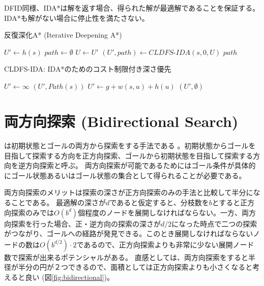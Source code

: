 DFID同様、IDA*は解を返す場合、得られた解が最適解であることを保証する。
IDA*も解がない場合に停止性を満たさない。

\begin{algorithm}
\caption{反復深化A* (Iterative Deepening A*)}
\label{alg:ida}
        $U' \leftarrow h(s)$\;
        $path \leftarrow \emptyset$\;
         {
          $U \leftarrow U'$\;
          $(U', path) \leftarrow CLDFS\text{-}IDA(s, 0, U)$\;
        }
        \Return $path$\;
\end{algorithm}

\begin{algorithm}
\caption{CLDFS-IDA: IDA*のためのコスト制限付き深さ優先}
\label{alg:cldfs-ida}
        $U' \leftarrow \infty$\;
	 {
		\Return $(U', Path(s))$\;
	}
	 {
	   {
             {
              $U' \leftarrow g + w(s, u) + h(u)$\;
              }
            }
	}
	\Return $(U', \emptyset)$\;
\end{algorithm}



\section{両方向探索 (Bidirectional Search)}
\label{sec:bidirectional-search}

は初期状態とゴールの両方から探索をする手法である \cite{pohl1971bi}。初期状態からゴールを目指して探索する方向を正方向探索、ゴールから初期状態を目指して探索する方向を逆方向探索と呼ぶ。
両方向探索が可能であるためにはゴール条件が具体的にゴール状態あるいはゴール状態の集合として得られることが必要である。

両方向探索のメリットは探索の深さが正方向探索のみの手法と比較して半分になることである。
最適解の深さが$d$であると仮定すると、分枝数を$b$とすると正方向探索のみでは$O(b^d)$個程度のノードを展開しなければならない。一方、両方向探索を行った場合、正・逆方向の探索の深さが$d/2$になった時点で二つの探索がつながり、ゴールへの経路が発見できる。このとき展開しなければならないノードの数は$O(b^{d/2}) \cdot 2$であるので、正方向探索よりも非常に少ない展開ノード数で探索が出来るポテンシャルがある。
直感としては、両方向探索をすると半径が半分の円が２つできるので、面積としては正方向探索よりも小さくなると考えると良い (図\ref{fig:bidirectional})。

